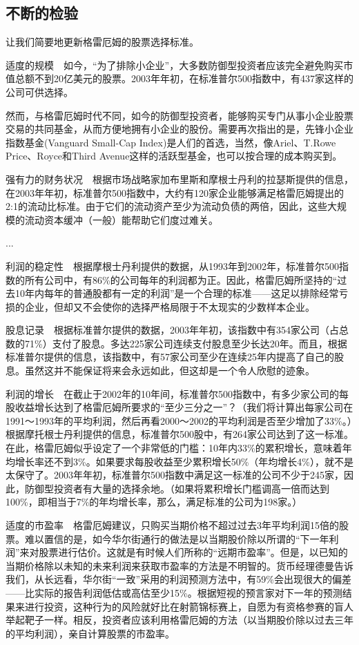 \documentclass[12pt,oneside]{book}
\begin{document}
\subsection{不断的检验}
让我们简要地更新格雷厄姆的股票选择标准。

适度的规模　如今，“为了排除小企业”，大多数防御型投资者应该完全避免购买市值总额不到20亿美元的股票。2003年年初，在标准普尔500指数中，有437家这样的公司可供选择。

然而，与格雷厄姆时代不同，如今的防御型投资者，能够购买专门从事小企业股票交易的共同基金，从而方便地拥有小企业的股份。需要再次指出的是，先锋小企业指数基金(Vanguard Small-Cap Index)是人们的首选，当然，像Ariel、T.Rowe Price、Royce和Third Avenue这样的活跃型基金，也可以按合理的成本购买到。

强有力的财务状况　根据市场战略家加布里斯和摩根士丹利的拉瑟斯提供的信息，在2003年年初，标准普尔500指数中，大约有120家企业能够满足格雷厄姆提出的2:1的流动比标准。由于它们的流动资产至少为流动负债的两倍，因此，这些大规模的流动资本缓冲（一般）能帮助它们度过难关。

...

利润的稳定性　根据摩根士丹利提供的数据，从1993年到2002年，标准普尔500指数的所有公司中，有86\%的公司每年的利润都为正。因此，格雷厄姆所坚持的“过去10年内每年的普通股都有一定的利润”是一个合理的标准——这足以排除经常亏损的企业，但却又不会使你的选择严格局限于不太现实的少数样本企业。

股息记录　根据标准普尔提供的数据，2003年年初，该指数中有354家公司（占总数的71\%）支付了股息。多达225家公司连续支付股息至少长达20年。而且，根据标准普尔提供的信息，该指数中，有57家公司至少在连续25年内提高了自己的股息。虽然这并不能保证将来会永远如此，但这却是一个令人欣慰的迹象。

利润的增长　在截止于2002年的10年间，标准普尔500指数中，有多少家公司的每股收益增长达到了格雷厄姆所要求的“至少三分之一”？（我们将计算出每家公司在1991～1993年的平均利润，然后再看2000～2002的平均利润是否至少增加了33\%。）根据摩托根士丹利提供的信息，标准普尔500股中，有264家公司达到了这一标准。在此，格雷厄姆似乎设定了一个非常低的门槛：10年内33\%的累积增长，意味着年均增长率还不到3\%。如果要求每股收益至少累积增长50\%（年均增长4\%），就不是太保守了。2003年年初，标准普尔500指数中满足这一标准的公司不少于245家，因此，防御型投资者有大量的选择余地。（如果将累积增长门槛调高一倍而达到100\%，即相当于7\%的年均增长率，那么，满足标准的公司为198家。）

适度的市盈率　格雷厄姆建议，只购买当期价格不超过过去3年平均利润15倍的股票。难以置信的是，如今华尔街通行的做法是以当期股价除以所谓的“下一年利润”来对股票进行估价。这就是有时候人们所称的“远期市盈率”。但是，以已知的当期价格除以未知的未来利润来获取市盈率的方法是不明智的。货币经理德曼告诉我们，从长远看，华尔街“一致”采用的利润预测方法中，有59\%会出现很大的偏差——比实际的报告利润低估或高估至少15\%。根据短视的预言家对下一年的预测结果来进行投资，这种行为的风险就好比在射箭锦标赛上，自愿为有资格参赛的盲人举起靶子一样。相反，投资者应该利用格雷厄姆的方法（以当期股价除以过去三年的平均利润），亲自计算股票的市盈率。
\end{document}
